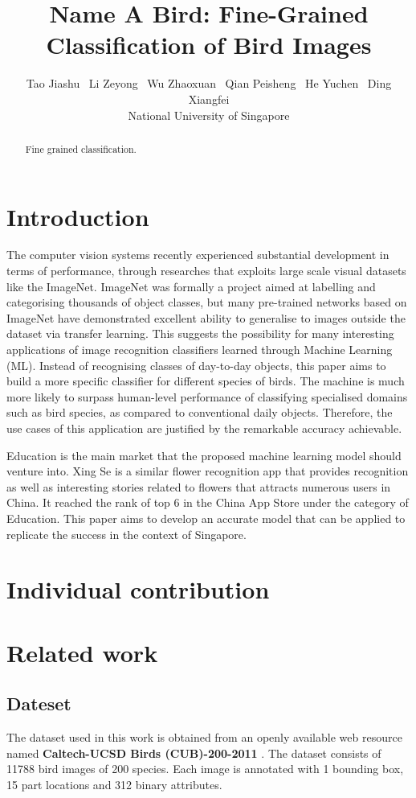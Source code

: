 \documentclass[letterpaper, 12pt]{article}
\title{Name A Bird: Fine-Grained Classification of Bird Images}
\author{Tao Jiashu \ Li Zeyong \  Wu Zhaoxuan \ Qian Peisheng \ He Yuchen \ Ding Xiangfei\\
National University of Singapore}
\date{}
\begin{document}
\maketitle

\begin{abstract}
Fine grained classification.
\end{abstract}

\section{Introduction}
The computer vision systems recently experienced substantial development in terms of
performance, through researches that exploits large scale visual datasets like the ImageNet.
ImageNet was formally a project aimed at labelling and categorising thousands of object classes,
but many pre-trained networks based on ImageNet have demonstrated excellent ability to generalise
to images outside the dataset via transfer learning. This suggests the possibility for many
interesting applications of image recognition classifiers learned through Machine Learning (ML).
Instead of recognising classes of day-to-day objects, this paper aims to build a more specific
classifier for different species of birds. The machine is much more likely to surpass human-level
performance of classifying specialised domains such as bird species, as compared to conventional
daily objects. Therefore, the use cases of this application are justified by the remarkable
accuracy achievable.

Education is the main market that the proposed machine learning model should venture into.
Xing Se is a similar flower recognition app that provides recognition as well as interesting
stories related to flowers that attracts numerous users in China. It reached the rank of top 6
in the China App Store under the category of Education. This paper aims to develop an accurate
model that can be applied to replicate the success in the context of Singapore.

\section{Individual contribution}

\section{Related work}
\subsection{Dateset}
The dataset used in this work is obtained from an openly available web resource named 
\textbf{Caltech-UCSD Birds (CUB)-200-2011} \cite{WahCUB_200_2011}.
The dataset consists of 11788 bird images of 200 species. Each image is annotated with 1
bounding box, 15 part locations and 312 binary attributes.
\end{document}
